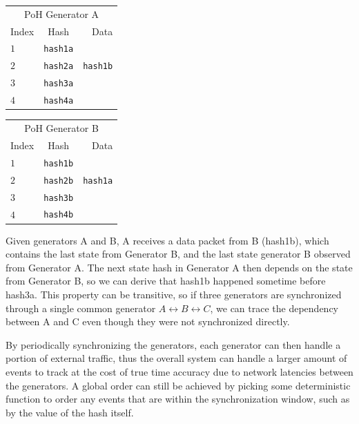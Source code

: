 \documentclass[12pt]{article}
\begin{document}
\begin{center}
  \begin{tabular}{|l c r|}

  \hline
    \multicolumn{3}{|c|}{PoH Generator A} \\
    Index & Hash & Data \\ \hline
    $1$ & \texttt{hash1a} & \\ 
    $2$ & \texttt{hash2a} & \texttt{hash1b} \\ 
    $3$ & \texttt{hash3a} & \\ 
    $4$ & \texttt{hash4a} & \\
    \hline
    \end{tabular}
  \begin{tabular}{| l  c  r |}
  \hline
    \multicolumn{3}{|c|}{PoH Generator B} \\
    Index & Hash & Data \\ \hline
    $1$ & \texttt{hash1b} & \\ 
    $2$ & \texttt{hash2b} & \texttt{hash1a} \\ 
    $3$ & \texttt{hash3b} & \\ 
    $4$ & \texttt{hash4b} & \\
    \hline
    \end{tabular}
\end{center}

Given generators A and B, A receives a data packet from B (hash1b), which contains the last state from Generator B, and the last state generator B observed from Generator A. The next state hash in Generator A then depends on the state from Generator B, so we can derive that hash1b happened sometime before hash3a. This property can be transitive, so if three generators are synchronized through a single common generator \(A \leftrightarrow B \leftrightarrow C\), we can trace the dependency between A and C even though they were not synchronized directly.

By periodically synchronizing the generators, each generator can then handle a portion of external traffic, thus the overall system can handle a larger amount of events to track at the cost of true time accuracy due to network latencies between the generators. A global order can still be achieved by picking some deterministic function to order any events that are within the synchronization window, such as by the value of the hash itself.
\end{document}
